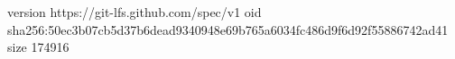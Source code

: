 version https://git-lfs.github.com/spec/v1
oid sha256:50ec3b07cb5d37b6dead9340948e69b765a6034fc486d9f6d92f55886742ad41
size 174916

